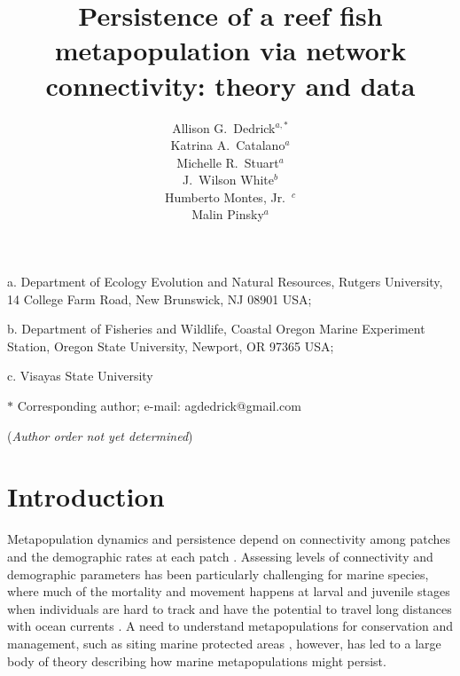 \documentclass[12pt, oneside]{article}   	%
\author{}
\author{Allison G.\ Dedrick$^{a, \ast}$ \\
Katrina A.\ Catalano$^a$ \\
Michelle R.\ Stuart$^a$ \\
J.\ Wilson White$^b$ \\
Humberto Montes, Jr.\ $^c$ \\
Malin Pinsky$^a$}
\title{Persistence of a reef fish metapopulation via network connectivity: theory and data}
\date{}
\begin{document}
\renewcommand{\topfraction}{0.95}
\maketitle{}

\noindent{} a. Department of Ecology Evolution and Natural Resources, Rutgers University, 14 College Farm Road, New Brunswick, NJ 08901 USA;

\noindent{} b. Department of Fisheries and Wildlife, Coastal Oregon Marine Experiment Station, Oregon State University, Newport, OR 97365 USA;

\noindent{} c. Visayas State University

\noindent{} $\ast$ Corresponding author; e-mail: agdedrick@gmail.com

(\textit{Author order not yet determined})


\bigskip



\linenumbers{}
\modulolinenumbers[3]

\section*{Introduction}

Metapopulation dynamics and persistence depend on connectivity among patches and the demographic rates at each patch \citep[e.g.][]{hastings_persistence_2006, hanski1998metapopulation}. Assessing levels of connectivity and demographic parameters has been particularly challenging for marine species, where much of the mortality and movement happens at larval and juvenile stages when individuals are hard to track and have the potential to travel long distances with ocean currents \citep[reviewed in][]{white2019connectivity}. A need to understand metapopulations for conservation and management, such as siting marine protected areas \citep[e.g.][]{botsford_dependence_2001,white_population_2010}, however, has led to a large body of theory describing how marine metapopulations might persist. 
\end{document}
